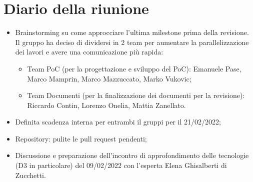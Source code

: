 \section{Diario della riunione}
\begin{itemize}
  \item Brainstorming su come approcciare l'ultima milestone prima della revisione. Il gruppo ha deciso di dividersi in 2 team per aumentare la parallelizzazione dei lavori e avere una comunicazione più rapida:
  \begin{itemize}
    \item Team PoC (per la progettazione e sviluppo del PoC): Emanuele Pase, Marco Mamprin, Marco Mazzuccato, Marko Vukovic;
    \item Team Documenti (per la finalizzazione dei documenti per la revisione): Riccardo Contin, Lorenzo Onelia, Mattia Zanellato.
  \end{itemize}
  \item Definita scadenza interna per entrambi il gruppi per il 21/02/2022;
  \item Repository: pulite le pull request pendenti;
  \item Discussione e preparazione dell'incontro di approfondimento delle tecnologie (D3 in particolare) del 09/02/2022 con l'esperta Elena Ghisalberti di Zucchetti.
\end{itemize}
